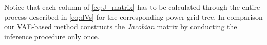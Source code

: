 Notice that each column of \eqref{eq:J_matrix} has to be calculated through the entire process described in \eqref{eq:dVs} for the corresponding power grid tree. In comparison our VAE-based method constructs the \textit{Jacobian} matrix by conducting the inference procedure only once.















